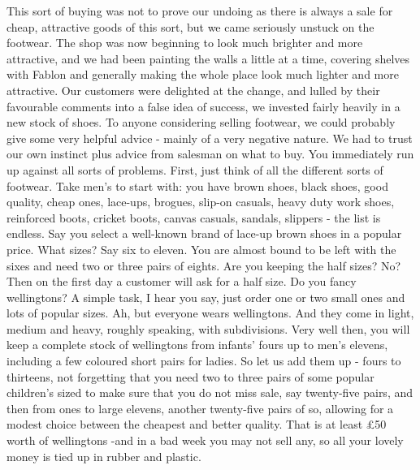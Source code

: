 This sort of buying was not to prove our undoing as there is always a sale for cheap, attractive goods of this sort, but we came seriously unstuck on the footwear. The shop was now beginning to look much brighter and more attractive, and we had been painting the walls a little at a time, covering shelves with Fablon and generally making the whole place look much lighter and more attractive. Our customers were delighted at the change, and lulled by their favourable comments into a false idea of success, we invested fairly heavily in a new stock of shoes. To anyone considering selling footwear, we could probably give some very helpful advice - mainly of a very negative nature. We had to trust our own instinct plus advice from salesman on what to buy. You immediately run up against all sorts of problems. First, just think of all the different sorts of footwear. Take men's to start with: you have brown shoes, black shoes, good quality, cheap ones, lace-ups, brogues, slip-on casuals, heavy duty work shoes, reinforced boots, cricket boots, canvas casuals, sandals, slippers - the list is endless. Say you select a well-known brand of lace-up brown shoes in a popular price. What sizes? Say six to eleven. You are almost bound to be left with the sixes and need two or three pairs of eights. Are you keeping the half sizes? No? Then on the first day a customer will ask for a half size. Do you fancy wellingtons? A simple task, I hear you say, just order one or two small ones and lots of popular sizes. Ah, but everyone wears wellingtons. And they come in light, medium and heavy, roughly speaking, with subdivisions. Very well then, you will keep a complete stock of wellingtons from infants' fours up to men's elevens, including a few coloured short pairs for ladies. So let us add them up - fours to thirteens, not forgetting that you need two to three pairs of some popular children's sized to make sure that you do not miss sale, say twenty-five pairs, and then from ones to large elevens, another twenty-five pairs of so, allowing for a modest choice between the cheapest and better quality. That is at least £50 worth of wellingtons -and in a bad week you may not sell any, so all your lovely money is tied up in rubber and plastic.

